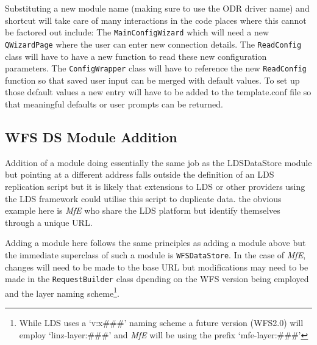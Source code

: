 \documentclass[a4paper]{report}
\begin{document}
Substituting a new module name (making sure to use the ODR driver name) and
shortcut will take care of many interactions in the code places where this
cannot be factored out include: 
The \lstinline|MainConfigWizard| which will need a new \lstinline|QWizardPage|
where the user can enter new connection details.
The \lstinline|ReadConfig| class will have to have a new function to read these
new configuration parameters.
The \lstinline|ConfigWrapper| class will have to reference the new
\lstinline|ReadConfig| function so that saved user input can be merged
with default values.
To set up those default values a new entry will have to be added to the
template.conf file so that meaningful defaults or user prompts can be returned.


\subsection*{WFS DS Module Addition}
Addition of a module doing essentially the same job as the LDSDataStore module
but pointing at a different address falls outside the definition of an LDS
replication script but it is likely that extensions to LDS or other providers
using the LDS framework could utilise this script to duplicate data. the obvious
example here is \emph{MfE} who share the LDS platform but identify themselves
through a unique URL.

Adding a module here follows the same principles as adding a module above but
the immediate superclass of such a module is \lstinline|WFSDataStore|. In the
case of \emph{MfE}, changes will need to be made to the base URL but modifications may
need to be made in the \lstinline|RequestBuilder| class dpending on the WFS
version being employed and the layer naming scheme\footnote{While LDS uses a
`v:x\#\#\#' naming scheme a future version (WFS2.0) will employ
`linz-layer:\#\#\#' and \emph{MfE} will be using the prefix `mfe-layer:\#\#\#'}.






 
\end{document}
